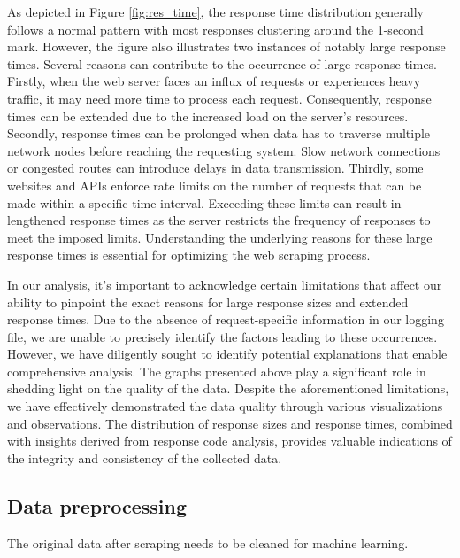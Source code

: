 \documentclass[12pt]{article} %
\begin{document}
{        As depicted in Figure \ref{fig:res_time}, the response time distribution generally follows a normal pattern with most responses clustering around the 1-second mark. However, the figure also illustrates two instances of notably large response times. Several reasons can contribute to the occurrence of large response times. Firstly, when the web server faces an influx of requests or experiences heavy traffic, it may need more time to process each request. Consequently, response times can be extended due to the increased load on the server's resources. Secondly, response times can be prolonged when data has to traverse multiple network nodes before reaching the requesting system. Slow network connections or congested routes can introduce delays in data transmission. Thirdly, some websites and APIs enforce rate limits on the number of requests that can be made within a specific time interval. Exceeding these limits can result in lengthened response times as the server restricts the frequency of responses to meet the imposed limits. Understanding the underlying reasons for these large response times is essential for optimizing the web scraping process. 

        In our analysis, it's important to acknowledge certain limitations that affect our ability to pinpoint the exact reasons for large response sizes and extended response times. Due to the absence of request-specific information in our logging file, we are unable to precisely identify the factors leading to these occurrences. However, we have diligently sought to identify potential explanations that enable comprehensive analysis. The graphs presented above play a significant role in shedding light on the quality of the data. Despite the aforementioned limitations, we have effectively demonstrated the data quality through various visualizations and observations. The distribution of response sizes and response times, combined with insights derived from response code analysis, provides valuable indications of the integrity and consistency of the collected data.
    
       
       
        \subsection{Data preprocessing}
        
		The original data after scraping needs to be cleaned for machine learning. 
        
}
\end{document}
